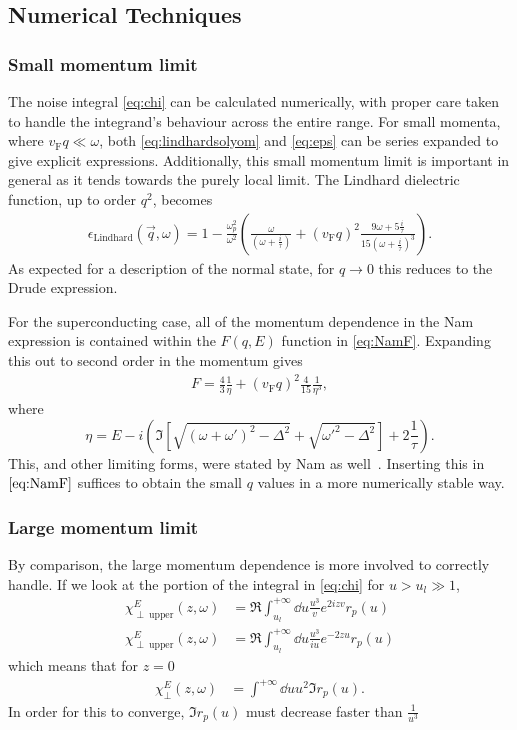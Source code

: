 \documentclass[%
 preprint,
 amsmath,amssymb,
 aps,
]{revtex4-2}
\newcommand{\vf}{v_{\mathrm{F}}}
\begin{document}
\subsection{Numerical Techniques \label{subsec:technical}}

\subsubsection{Small momentum limit} \label{subsubsec:smallq}
The noise integral \eqref{eq:chi} can be calculated numerically, with proper care taken to handle the integrand's behaviour across the entire range.
For small momenta, where $\vf q \ll \omega$, both \eqref{eq:lindhardsolyom} and \eqref{eq:eps} can be series expanded to give explicit expressions.
Additionally, this small momentum limit is important in general as it tends towards the purely local limit.
The Lindhard dielectric function, up to order $q^2$, becomes
\begin{gather}
	\epsilon_{\mathrm{Lindhard}}(\vec{q}, \omega) = 1 - \frac{\omega_p^2}{\omega^2} \left(\frac{\omega}{(\omega + \frac{i}{\tau})} + (\vf q)^2  \frac{9 \omega + 5 \frac{i}{\tau}}{15 (\omega + \frac{i}{\tau})^3} \right). \label{eq:lindhardsmallkseries}
\end{gather}
As expected for a description of the normal state, for $q \rightarrow 0$ this reduces to the Drude expression.

For the superconducting case, all of the momentum dependence in the Nam expression is contained within the $F(q, E)$ function in \eqref{eq:NamF}.
Expanding this out to second order in the momentum gives
\begin{align}
	F = \frac43 \frac{1}{\eta} + (\vf q)^2\frac{4}{15} \frac{1}{\eta^3},
\end{align}
where
\begin{equation}
	\eta = E - i \left(\Im[\sqrt{(\omega + \omega')^2 - \Delta^2} + \sqrt{\omega'^2 - \Delta^2}] + 2 \frac{1}{\tau} \right).
\end{equation}
This, and other limiting forms, were stated by Nam as well~\cite{Nam1967}.
Inserting this in $\eqref{eq:NamF}$ suffices to obtain the small $q$ values in a more numerically stable way.

\subsubsection{Large momentum limit} \label{subsubsec:bigq}
By comparison, the large momentum dependence is more involved to correctly handle.
If we look at the portion of the integral in \eqref{eq:chi} for $u > u_l \gg 1$,
\begin{align}
	\chi_{\perp\ \mathrm{upper}}^E(z, \omega) &= \Re \int_{u_l}^{+\infty} \dd{u} \frac{u^3}{v} e^{2 i z v} r_p(u) \\
	\chi_{\perp\ \mathrm{upper}}^E(z, \omega) &= \Re \int_{u_l}^{+\infty} \dd{u} \frac{u^3}{i u} e^{-2 z u} r_p(u)
\end{align}
which means that for $z = 0$
\begin{align}
	\chi_\perp^E(z, \omega) &= \int^{+\infty} \dd{u} u^2 \Im r_p(u).
\end{align}
In order for this to converge, $\Im r_p(u)$ must decrease faster than $\frac{1}{u^3}$
\end{document}
